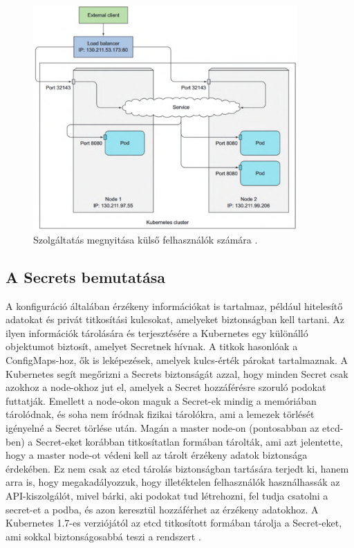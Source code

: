 \begin{figure}[ht]
    \centering
         \includegraphics[width=0.9\textwidth]{figures/kubernetes/service-overview.png}
          \caption{Szolgáltatás megnyitása külső felhasználók számára \cite{Marko17}.}
           \label{service-overview}
\end{figure}

\subsection{A Secrets bemutatása}
A konfiguráció általában érzékeny információkat is tartalmaz, például hitelesítő adatokat és privát titkosítási kulcsokat, amelyeket biztonságban kell tartani.
Az ilyen információk tárolására és terjesztésére a Kubernetes egy különálló objektumot biztosít, amelyet Secretnek hívnak.
A titkok hasonlóak a ConfigMaps-hoz, ők is leképezések, amelyek kulcs-érték párokat tartalmaznak.
A Kubernetes segít megőrizni a Secrets biztonságát azzal, hogy minden Secret csak azokhoz a node-okhoz jut el, amelyek a Secret hozzáférésre szoruló podokat futtatják.
Emellett a node-okon maguk a Secret-ek mindig a memóriában tárolódnak, és soha nem íródnak fizikai tárolókra, ami a lemezek törlését igényelné a Secret törlése után. Magán a master node-on (pontosabban az etcd-ben) a Secret-eket korábban titkosítatlan formában tárolták, ami azt jelentette, hogy a master node-ot védeni kell az tárolt érzékeny adatok biztonsága érdekében.
Ez nem csak az etcd tárolás biztonságban tartására terjedt ki, hanem arra is, hogy megakadályozzuk, hogy illetéktelen felhasználók használhassák az API-kiszolgálót, mivel bárki, aki podokat tud létrehozni, fel tudja csatolni a secret-et a podba, és azon keresztül hozzáférhet az érzékeny adatokhoz.
A Kubernetes 1.7-es verziójától az etcd titkosított formában tárolja a Secret-eket, ami sokkal biztonságosabbá teszi a rendszert \cite{Marko17}.

